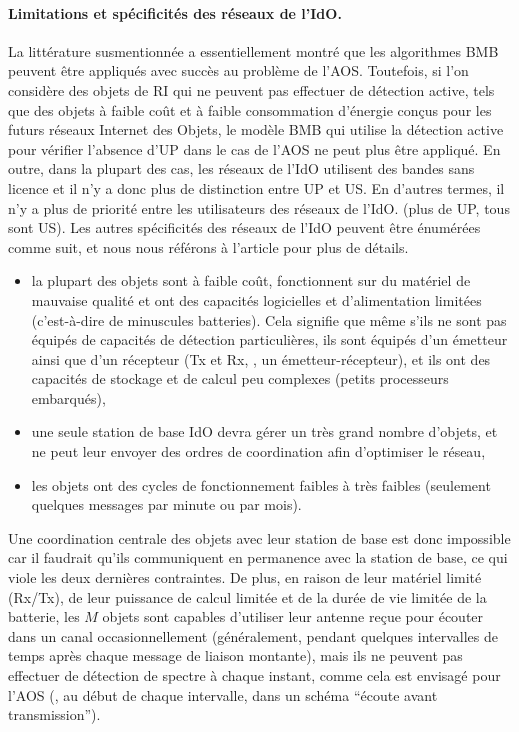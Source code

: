 \begin{resume_fr}
\paragraph{Limitations et spécificités des réseaux de l'IdO.}
%
La littérature susmentionnée a essentiellement montré que les algorithmes BMB peuvent être appliqués avec succès au problème de l'AOS.
Toutefois, si l'on considère des objets de RI qui ne peuvent pas effectuer de détection active, tels que des objets à faible coût et à faible consommation d'énergie conçus pour les futurs réseaux Internet des Objets, le modèle BMB qui utilise la détection active pour vérifier l'absence d'UP dans le cas de l'AOS ne peut plus être appliqué.
En outre, dans la plupart des cas, les réseaux de l'IdO utilisent des bandes sans licence et il n'y a donc plus de distinction entre UP et US.
En d'autres termes, il n'y a plus de priorité entre les utilisateurs des réseaux de l'IdO.
(plus de UP, tous sont US).
%
Les autres spécificités des réseaux de l'IdO peuvent être énumérées comme suit,
et nous nous référons à l'article \cite{Centenaro16} pour plus de détails.
%
\begin{itemize}\tightlist
    \item
    la plupart des objets sont à faible coût, fonctionnent sur du matériel de mauvaise qualité et ont des capacités logicielles et d'alimentation limitées (c'est-à-dire de minuscules batteries).
    Cela signifie que même s'ils ne sont pas équipés de capacités de détection particulières,
    ils sont équipés d'un émetteur ainsi que d'un récepteur (Tx et Rx, \ie, un émetteur-récepteur),
    et ils ont des capacités de stockage et de calcul peu complexes (petits processeurs embarqués),
    \item
    une seule station de base IdO devra gérer un très grand nombre d'objets,
    et ne peut leur envoyer des ordres de coordination afin d'optimiser le réseau,
    \item
    les objets ont des cycles de fonctionnement faibles à très faibles (seulement quelques messages par minute ou par mois).
\end{itemize}

Une coordination centrale des objets avec leur station de base est donc impossible car il faudrait qu'ils communiquent en permanence avec la station de base, ce qui viole les deux dernières contraintes.
%
De plus, en raison de leur matériel limité (Rx/Tx), de leur puissance de calcul limitée et de la durée de vie limitée de la batterie, les $M$ objets sont capables d'utiliser leur antenne reçue pour écouter dans un canal occasionnellement (généralement, pendant quelques intervalles de temps après chaque message de liaison montante), mais ils ne peuvent pas effectuer de détection de spectre à chaque instant, comme cela est envisagé pour l'AOS (\ie, au début de chaque intervalle, dans un schéma ``écoute avant transmission'').


\end{resume_fr}
